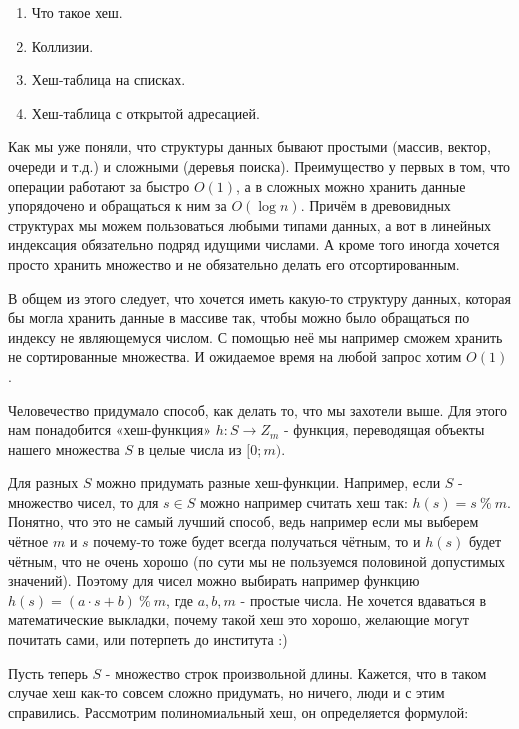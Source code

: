 \label{md2tex13}
\hyperref[md2texREADME]{\color{cyan}{К главному описанию}}


\begin{enumerate}
    \item Что такое хеш.
    \item Коллизии.
    \item Хеш-таблица на списках.
    \item Хеш-таблица с открытой адресацией.
\end{enumerate}


Как мы уже поняли, что структуры данных бывают простыми (массив, вектор, очереди и т.д.) и сложными (деревья поиска). Преимущество у первых в том, что операции работают за быстро $O(1)$, а в сложных можно хранить данные упорядочено и обращаться к ним за $O(\log n)$. Причём в древовидных структурах мы можем пользоваться любыми типами данных, а вот в линейных индексация обязательно подряд идущими числами. А кроме того иногда хочется просто хранить множество и не обязательно делать его отсортированным.

В общем из этого следует, что хочется иметь какую-то структуру данных, которая бы могла хранить данные в массиве так, чтобы можно было обращаться по индексу не являющемуся числом. С помощью неё мы например сможем хранить не сортированные множества. И ожидаемое время на любой запрос хотим $O(1)$.


Человечество придумало способ, как делать то, что мы захотели выше. Для этого нам понадобится «хеш-функция» $h: S \to Z_m$ - функция, переводящая объекты нашего множества $S$ в целые числа из $[0; m)$. 

Для разных $S$ можно придумать разные хеш-функции. Например, если $S$ - множество чисел, то для $s \in S$ можно например считать хеш так: $h(s) = s\ \%\ m$. Понятно, что это не самый лучший способ, ведь например если мы выберем чётное $m$ и $s$ почему-то тоже будет всегда получаться чётным, то и $h(s)$ будет чётным, что не очень хорошо (по сути мы не пользуемся половиной допустимых значений). Поэтому для чисел можно выбирать например функцию $h(s) = (a \cdot s + b)\ \%\ m$, где $a, b, m$ - простые числа. Не хочется вдаваться в математические выкладки, почему такой хеш это хорошо, желающие могут почитать сами, или потерпеть до института :)

Пусть теперь $S$ - множество строк произвольной длины. Кажется, что в таком случае хеш как-то совсем сложно придумать, но ничего, люди и с этим справились. Рассмотрим полиномиальный хеш, он определяется формулой:


